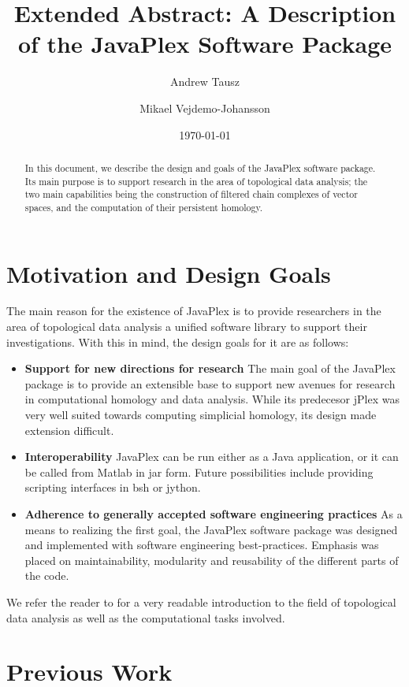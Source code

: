 \documentclass[10pt]{article}
\title{Extended Abstract: A Description of the JavaPlex Software Package}
\author{Andrew Tausz}
\author{Mikael Vejdemo-Johansson}
\affil{Stanford University}
\date{\today}
\begin{document}
\maketitle

\begin{abstract}
In this document, we describe the design and goals of the JavaPlex software package. Its main purpose is to support research in the area of topological data analysis; the two main capabilities being the construction of filtered chain complexes of vector spaces, and the computation of their persistent homology.
\end{abstract}

\section{Motivation and Design Goals}

The main reason for the existence of JavaPlex is to provide researchers in the area of topological data analysis a unified software library to support their investigations. With this in mind, the design goals for it are as follows:

\begin{itemize}
\item {\bf Support for new directions for research} The main goal of the JavaPlex package is to provide an extensible base to support new avenues for research in computational homology and data analysis. While its predecesor jPlex was very well suited towards computing simplicial homology, its design made extension difficult.
\item {\bf Interoperability} JavaPlex can be run either as a Java application, or it can be called from Matlab in jar form. Future possibilities include providing scripting interfaces in bsh or jython.
\item {\bf Adherence to generally accepted software engineering practices} As a means to realizing the first goal, the JavaPlex software package was designed and implemented with software engineering best-practices. Emphasis was placed on maintainability, modularity and reusability of the different parts of the code.
\end{itemize}

We refer the reader to \cite{Carlsson_09} for a very readable introduction to the field of topological data analysis as well as the computational tasks involved.

\section{Previous Work}
\end{document}
